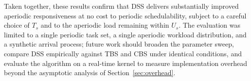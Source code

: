 \documentclass[conference]{IEEEtran}
\begin{document}
    Taken together, these results confirm that DSS delivers substantially improved aperiodic responsiveness at no cost to periodic schedulability, subject to a careful choice of $T_s$ and to the aperiodic load remaining within $U_s$. The evaluation was limited to a single periodic task set, a single aperiodic workload distribution, and a synthetic arrival process; future work should broaden the parameter sweep, compare DSS empirically against TBS and CBS under identical conditions, and evaluate the algorithm on a real-time kernel to measure implementation overhead beyond the asymptotic analysis of Section~\ref{sec:overhead}.


    
\end{document}
